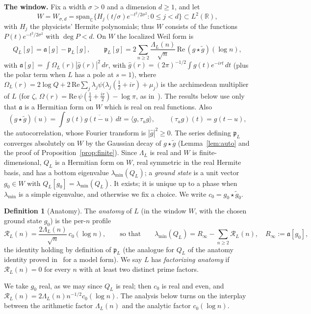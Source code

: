 \documentclass[11pt]{amsart}
\theoremstyle{definition}
\newtheorem{definition}[theorem]{Definition}
\theoremstyle{remark}
\newcommand{\fa}{\mathfrak a}
\newcommand{\fp}{\mathfrak p}
\newcommand{\cR}{\mathcal R}
\begin{document}
\medskip\noindent\textbf{The window.} Fix a width $\sigma>0$ and a dimension
$d\ge1$, and let
\[
W=W_{\sigma,d}=\mathrm{span}_{\mathbb C}\bigl\{H_j(t/\sigma)e^{-t^2/2\sigma^2}:
0\le j<d\bigr\}\subset L^2(\mathbb R),
\]
with $H_j$ the physicists' Hermite polynomials; thus $W$ consists of the
functions $P(t)e^{-t^2/2\sigma^2}$ with $\deg P<d$. On $W$ the localized Weil
form is
\[
Q_L[g]=\fa[g]-\fp_L[g],\qquad
\fp_L[g]=2\sum_{n\ge2}\frac{\Lambda_L(n)}{\sqrt n}\,\mathrm{Re}\,(g\star\tilde g)(\log n),
\]
with $\fa[g]=\int\Omega_L(r)|\widehat g(r)|^2\,dr$, with $\widehat g(r)=(2\pi)^{-1/2}\int g(t)e^{-irt}\,dt$ (plus the polar term when
$L$ has a pole at $s=1$), where $\Omega_L(r)=2\log Q+2\,\mathrm{Re}\sum_j
\lambda_j\psi\bigl(\lambda_j(\tfrac12+ir)+\mu_j\bigr)$ is the archimedean
multiplier of $L$ (for $\zeta$, $\Omega(r)=\mathrm{Re}\,
\psi(\tfrac14+\tfrac{ir}2)-\log\pi$, as in~\cite{RP7}). The results below use
only that $\fa$ is a Hermitian form on $W$ which is real on real functions. Also
\[
(g\star\tilde g)(u)=\int g(t)\overline{g(t-u)}\,dt=\langle g,\tau_ug\rangle,
\qquad(\tau_ug)(t)=g(t-u),
\]
the autocorrelation, whose Fourier transform is $|\widehat g|^2\ge0$. The series
defining $\fp_L$ converges absolutely on $W$ by the Gaussian decay of
$g\star\tilde g$ (Lemma~\ref{lem:auto} and the proof of
Proposition~\ref{prop:finite}). Since $\Lambda_L$ is real and $W$ is
finite-dimensional, $Q_L$ is a Hermitian form on $W$, real symmetric in the real
Hermite basis, and has a bottom eigenvalue $\lambda_{\min}(Q_L)$; a
\emph{ground state} is a unit vector $g_0\in W$ with
$Q_L[g_0]=\lambda_{\min}(Q_L)$. It exists; it is unique up to a phase when
$\lambda_{\min}$ is a simple eigenvalue, and otherwise we fix a choice. We write
$c_0=g_0\star\tilde g_0$.

\begin{definition}[Anatomy]\label{def:anat}
The \emph{anatomy} of $L$ (in the window $W$, with the chosen ground state
$g_0$) is the per-$n$ profile
\[
\cR_L(n)=\frac{2\Lambda_L(n)}{\sqrt n}\,c_0(\log n),\qquad\text{so
that}\qquad
\lambda_{\min}(Q_L)=R_\infty-\sum_{n\ge2}\cR_L(n),\quad R_\infty:=\fa[g_0],
\]
the identity holding by definition of $\fp_L$ (the analogue for $Q_L$ of the
anatomy identity proved in~\cite[Prop.~3.1]{RP9} for a model form). We say $L$ has \emph{factorizing anatomy} if $\cR_L(n)=0$ for
every $n$ with at least two distinct prime factors.
\end{definition}

We take $g_0$ real, as we may since $Q_L$ is real; then $c_0$ is real and even,
and $\cR_L(n)=2\Lambda_L(n)n^{-1/2}c_0(\log n)$. The analysis below turns on the
interplay between the arithmetic factor $\Lambda_L(n)$ and the analytic factor
$c_0(\log n)$.
\end{document}
